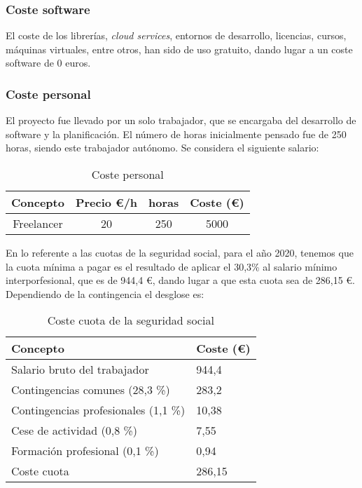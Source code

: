 \subsubsection{Coste software}
El coste de los librerías, \emph{cloud services}, entornos de desarrollo, licencias, cursos, máquinas virtuales, entre otros, han sido de uso gratuito, dando lugar a un coste software de 0 euros.

\subsubsection{Coste personal}
El proyecto fue llevado por un solo trabajador, que se encargaba del desarrollo de software y la planificación. El número de horas inicialmente pensado fue de 250 horas, siendo este trabajador autónomo. Se considera el siguiente salario:

\begin{table}[H]
	\begin{center}
		\begin{tabular}{cccc}
			\hline
			Concepto                        & Precio €/h	& horas		& Coste (€)  	\\ \hline
			Freelancer					    & 20      		& 250		& 5000			\\ \hline
	
		\end{tabular}
		\caption{Coste personal}
		\label{table:costepersonal}
	\end{center}
\end{table}

En lo referente a las cuotas de la seguridad social, para el año 2020, tenemos que la cuota mínima a pagar es el resultado de aplicar el 30,3\% al salario mínimo interporfesional, que es de 944,4 €, dando lugar a que esta cuota sea de 286,15 €. Dependiendo de la contingencia el desglose es:

\begin{table}[H]
	\begin{center}
		\begin{tabular}{ll}
			\hline
			Concepto                        	& Coste (€) \\ \hline
			Salario bruto del trabajador    	& 944,4      \\
			Contingencias comunes (28,3 \%) 	& 283,2     \\
			Contingencias profesionales (1,1 \%) & 10,38     \\
			Cese de actividad (0,8 \%)          & 7,55        \\
			Formación profesional (0,1 \%)  & 0,94       \\ \hline
			Coste cuota				            & 286,15 
		\end{tabular}
	\caption{Coste cuota de la seguridad social}
	\label{table:costecuota}
	\end{center}
\end{table}

